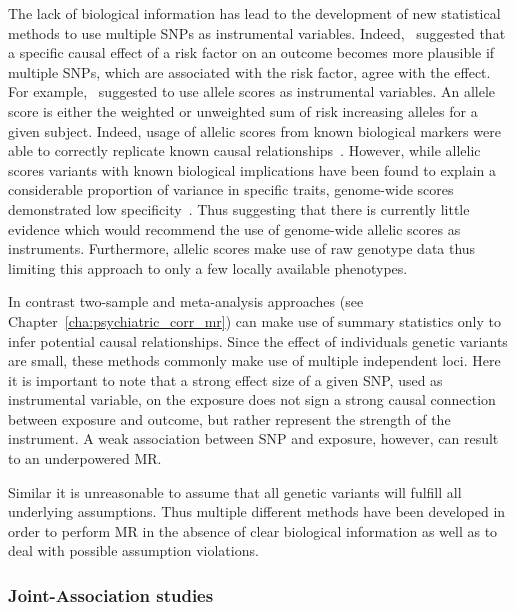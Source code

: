 The lack of biological information has lead to the development of new statistical methods to use multiple SNPs as instrumental variables. 
Indeed,~\citet{Burgess2016a} suggested that a specific causal effect of a risk factor on an outcome becomes more plausible if multiple SNPs, which are associated with the risk factor, agree with the effect.
For example,~\citet{Burgess2013} suggested to use allele scores as instrumental variables.
An allele score is either the weighted or unweighted sum of risk increasing alleles for a given subject.
Indeed, usage of allelic scores from known biological markers were able to correctly replicate known causal relationships~\cite{Timpson2005,CReactiveProteinCoronaryHeartDiseaseGeneticsCollaborationCCGC2011}.
However, while allelic scores variants with known biological implications have been found to explain a considerable proportion of variance in specific traits, genome-wide scores demonstrated low specificity~\cite{Evans2013}.
Thus suggesting that there is currently little evidence which would recommend the use of genome-wide allelic scores as instruments.
Furthermore, allelic scores make use of raw genotype data thus limiting this approach to only a few locally available phenotypes.

In contrast two-sample and meta-analysis approaches (see Chapter~\ref{cha:psychiatric_corr_mr}) can make use of summary statistics only to infer potential causal relationships. 
Since the effect of individuals genetic variants are small, these methods commonly make use of multiple independent loci.
Here it is important to note that a strong effect size of a given SNP, used as instrumental variable, on the exposure does not sign a strong causal connection between exposure and outcome, but rather represent the strength of the instrument.
A weak association between SNP and exposure, however, can result to an underpowered MR\@.

Similar it is unreasonable to assume that all genetic variants will fulfill all underlying assumptions.
Thus multiple different methods have been developed in order to perform MR in the absence of clear biological information as well as to deal with possible assumption violations.

\subsubsection{Joint-Association studies}
\label{ssub:sensitivity_analysis}

